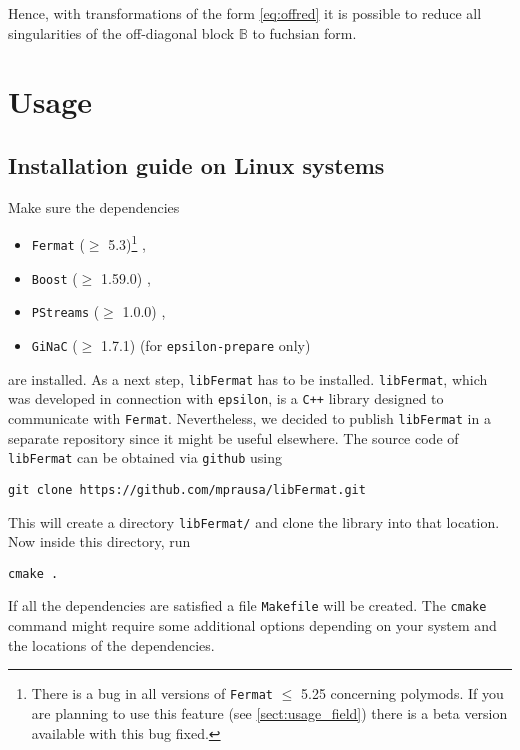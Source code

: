\documentclass[12pt]{article}
\numberwithin{equation}{section}
\numberwithin{figure}{section}
\newcommand{\B}{\mathds{B}}
\begin{document}
        Hence, with transformations of the form \eqref{eq:offred} it is possible to reduce all singularities of the off-diagonal block $\B$ to fuchsian form.
  \section{Usage} \label{sect:usage}
    \subsection{Installation guide on Linux systems}
      Make sure the dependencies 
      \begin{itemize}
        \item \texttt{Fermat} ($\geq$ 5.3)\footnote{
            There is a bug in all versions of \texttt{Fermat} $\leq$ 5.25 concerning polymods. 
            If you are planning to use this feature (see \ref{sect:usage_field}) there is a beta version available with this bug fixed.
          } \cite{Lewis:fermat},
        \item \texttt{Boost} ($\geq$ 1.59.0) \cite{boost},
        \item \texttt{PStreams} ($\geq$ 1.0.0) \cite{pstreams},
        \item \texttt{GiNaC} ($\geq$ 1.7.1) \cite{Bauer:2000cp} (for \texttt{epsilon-prepare} only)
      \end{itemize}
      are installed.
      As a next step, \texttt{libFermat} has to be installed.
      \texttt{libFermat}, which was developed in connection with \texttt{epsilon}, is a \texttt{C++} library designed to communicate with \texttt{Fermat}.
      Nevertheless, we decided to publish \texttt{libFermat} in a separate repository since it might be useful elsewhere.
      The source code of \texttt{libFermat} can be obtained via \texttt{github} using
      \begin{lstlisting}[basicstyle=\ttfamily,xleftmargin=-4em]
        git clone https://github.com/mprausa/libFermat.git
      \end{lstlisting}
      This will create a directory \texttt{libFermat/} and clone the library into that location.
      Now inside this directory, run
      \begin{lstlisting}[basicstyle=\ttfamily,xleftmargin=-4em]
        cmake .
      \end{lstlisting}
      If all the dependencies are satisfied a file \texttt{Makefile} will be created.
      The \texttt{cmake} command might require some additional options depending on your system and the locations of the dependencies.
\end{document}
